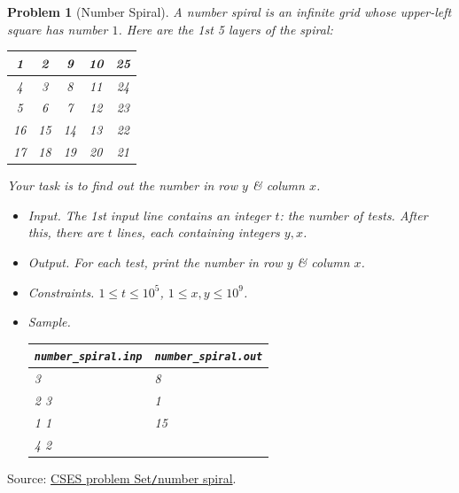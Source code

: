 \documentclass{article}
\newtheorem{problem}{Problem}
\begin{document}
\begin{problem}[Number Spiral]
	A \emph{number spiral} is an infinite grid whose upper-left square has number $1$. Here are the 1st 5 layers of the spiral:
	\begin{table}[H]
		\centering
		\begin{tabular}{|c|c|c|c|c|}
			\hline
			1 & 2 & 9 & 10 & 25 \\
			\hline
			4 & 3 & 8 & 11 & 24 \\
			\hline
			5 & 6 & 7 & 12 & 23 \\
			\hline
			16 & 15 & 14 & 13 & 22 \\
			\hline
			17 & 18 & 19 & 20 & 21 \\
			\hline
		\end{tabular}
	\end{table}
	Your task is to find out the number in row $y$ \& column $x$.
	\begin{itemize}
		\item {\sf Input.} The 1st input line contains an integer $t$: the number of tests. After this, there are $t$ lines, each containing integers $y,x$.
		\item {\sf Output.} For each test, print the number in row $y$ \& column $x$.
		\item {\sf Constraints.} $1\le t\le10^5$, $1\le x,y\le10^9$.
		\item {\sf Sample.}
		\begin{table}[H]
			\centering
			\begin{tabular}{|l|l|}
				\hline
				\verb|number_spiral.inp| & \verb|number_spiral.out| \\
				\hline
				3 & 8 \\
				2 3 & 1 \\
				1 1 & 15 \\
				4 2 & \\
				\hline				
			\end{tabular}
		\end{table}
	\end{itemize}
\end{problem}
Source: \href{https://cses.fi/problemset/task/1071}{CSES problem Set{\tt/}number spiral}.
\end{document}
